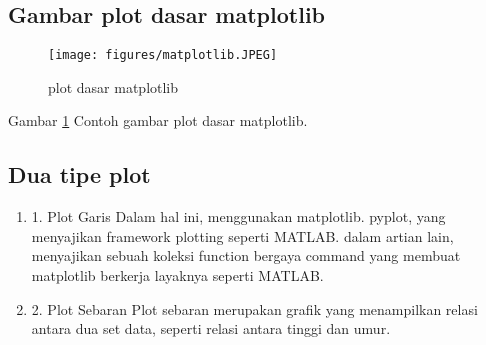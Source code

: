 \subsection {Gambar plot dasar matplotlib}

	\begin{figure}[ht]
	\centerline{\texttt{[image: figures/matplotlib.JPEG]}}
	\caption{plot dasar matplotlib}
	\label{Gambar}
	\end{figure}
      
      Gambar \ref{Gambar} Contoh gambar plot dasar matplotlib.
	  
\subsection {Dua tipe plot}
\begin{enumerate}
\item 
	1. Plot Garis
		Dalam hal ini, menggunakan matplotlib. pyplot, yang menyajikan framework plotting seperti MATLAB. dalam artian lain, menyajikan sebuah koleksi function bergaya command yang membuat matplotlib berkerja layaknya seperti MATLAB.
\item
	2. Plot Sebaran
		Plot sebaran merupakan grafik yang menampilkan relasi antara dua set data, seperti relasi antara tinggi dan umur.
\end{enumerate}

\cite{articlekoehler2018interactive}
\cite{articlecontrerasfree}
	  
	  
